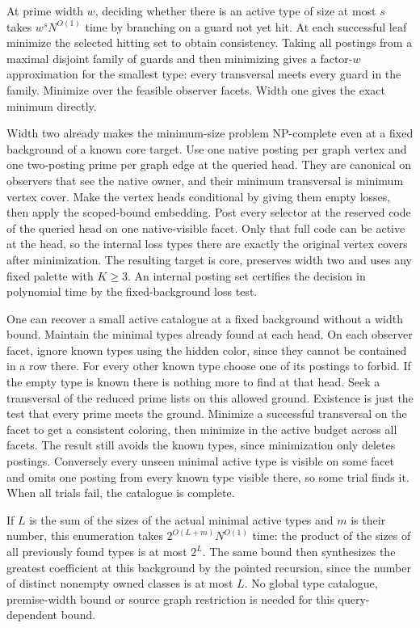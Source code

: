 At prime width $w$, deciding whether
there is an active type of size at most
$s$ takes $w^s N^{O(1)}$ time by branching
on a guard not yet hit. At each successful
leaf minimize the selected hitting set
to obtain consistency. Taking all postings
from a maximal disjoint family of guards
and then minimizing gives a factor-$w$
approximation for the smallest type:
every transversal meets every guard in
the family. Minimize over the feasible
observer facets. Width one gives the
exact minimum directly.

Width two already makes the minimum-size
problem NP-complete even at a fixed
background of a known core target. Use
one native posting per graph vertex and
one two-posting prime per graph edge
at the queried head. They are canonical
on observers that see the native owner,
and their minimum transversal is minimum
vertex cover. Make the vertex heads
conditional by giving them empty losses,
then apply the scoped-bound embedding.
Post every selector at the reserved code
of the queried head on one native-visible
facet. Only that full code can be active
at the head, so the internal loss types
there are exactly the original vertex
covers after minimization. The resulting
target is core, preserves width two and
uses any fixed palette with $K\geq3$.
An internal posting set certifies the
decision in polynomial time by the
fixed-background loss test.

One can recover a small active catalogue
at a fixed background without a width
bound. Maintain the minimal types already
found at each head. On each observer
facet, ignore known types using the hidden
color, since they cannot be contained
in a row there. For every other known
type choose one of its postings to forbid.
If the empty type is known there is
nothing more to find at that head.
Seek a transversal of the reduced prime
lists on this allowed ground. Existence
is just the test that every prime meets
the ground. Minimize a successful
transversal on the facet to get a
consistent coloring, then minimize in
the active budget across all facets.
The result still avoids the known types,
since minimization only deletes postings.
Conversely every unseen minimal active
type is visible on some facet and omits
one posting from every known type
visible there, so some trial finds it.
When all trials fail, the catalogue is
complete.

If $L$ is the sum of the sizes of the
actual minimal active types and $m$ is
their number, this enumeration takes
$2^{O(L+m)}N^{O(1)}$ time: the product
of the sizes of all previously found
types is at most $2^L$. The same bound
then synthesizes the greatest coefficient
at this background by the pointed
recursion, since the number of distinct
nonempty owned classes is at most $L$.
No global type catalogue, premise-width
bound or source graph restriction is
needed for this query-dependent bound.


